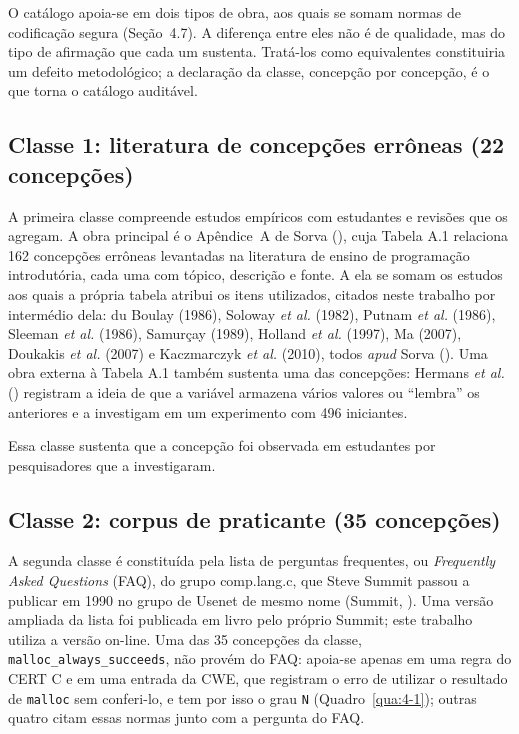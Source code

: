O catálogo apoia-se em dois tipos de obra, aos quais se somam normas de codificação segura (Seção~4.7). A diferença entre eles não é de qualidade, mas do tipo de afirmação que cada um sustenta. Tratá-los como equivalentes constituiria um defeito metodológico; a declaração da classe, concepção por concepção, é o que torna o catálogo auditável.

\subsection{Classe 1: literatura de concepções errôneas (22 concepções)}

A primeira classe compreende estudos empíricos com estudantes e revisões que os agregam. A obra principal é o Apêndice~A de Sorva (\citeyear{sorva2012}), cuja Tabela A.1 relaciona 162 concepções errôneas levantadas na literatura de ensino de programação introdutória, cada uma com tópico, descrição e fonte. A ela se somam os estudos aos quais a própria tabela atribui os itens utilizados, citados neste trabalho por intermédio dela: du Boulay (1986), Soloway \textit{et al.} (1982), Putnam \textit{et al.} (1986), Sleeman \textit{et al.} (1986), Samurçay (1989), Holland \textit{et al.} (1997), Ma (2007), Doukakis \textit{et al.} (2007) e Kaczmarczyk \textit{et al.} (2010), todos \textit{apud} Sorva (\citeyear{sorva2012}). Uma obra externa à Tabela A.1 também sustenta uma das concepções: Hermans \textit{et al.} (\citeyear{hermans2018}) registram a ideia de que a variável armazena vários valores ou ``lembra'' os anteriores e a investigam em um experimento com 496 iniciantes.

Essa classe sustenta que a concepção foi observada em estudantes por pesquisadores que a investigaram.

\subsection{Classe 2: corpus de praticante (35 concepções)}

A segunda classe é constituída pela lista de perguntas frequentes, ou \textit{Frequently Asked Questions} (FAQ), do grupo comp.lang.c, que Steve Summit passou a publicar em 1990 no grupo de Usenet de mesmo nome (Summit, \citeyear{summit2005}). Uma versão ampliada da lista foi publicada em livro pelo próprio Summit; este trabalho utiliza a versão on-line. Uma das 35 concepções da classe, \texttt{malloc\_\allowbreak{}always\_\allowbreak{}succeeds}, não provém do FAQ: apoia-se apenas em uma regra do CERT C e em uma entrada da CWE, que registram o erro de utilizar o resultado de \texttt{malloc} sem conferi-lo, e tem por isso o grau \texttt{N} (Quadro~\ref{qua:4-1}); outras quatro citam essas normas junto com a pergunta do FAQ.

